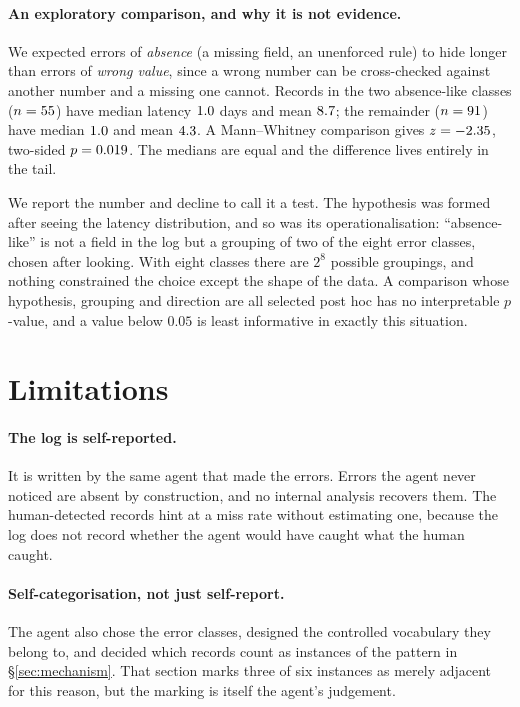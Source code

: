 \documentclass[11pt,a4paper]{article}
\begin{document}
\paragraph{An exploratory comparison, and why it is not evidence.}
We expected errors of \emph{absence} (a missing field, an unenforced rule) to
hide longer than errors of \emph{wrong value}, since a wrong number can be
cross-checked against another number and a missing one cannot. Records in the
two absence-like classes ($n = 55$) have median latency $1.0$ days
and mean $8.7$; the remainder ($n = 91$) have median $1.0$ and
mean $4.3$. A Mann--Whitney comparison gives $z = -2.35$, two-sided
$p = 0.019$. The medians are equal and the difference lives entirely in the
tail.

We report the number and decline to call it a test. The hypothesis was formed
after seeing the latency distribution, and so was its operationalisation:
``absence-like'' is not a field in the log but a grouping of two of the eight
error classes, chosen after looking. With eight classes there are $2^{8}$
possible groupings, and nothing constrained the choice except the shape of the
data. A comparison whose hypothesis, grouping and direction are all selected
post hoc has no interpretable $p$-value, and a value below $0.05$ is least
informative in exactly this situation.

\section{Limitations}\label{sec:limits}

\paragraph{The log is self-reported.} It is written by the same agent that
made the errors. Errors the agent never noticed are absent by construction,
and no internal analysis recovers them. The \ErrHuman{} human-detected records
hint at a miss rate without estimating one, because the log does not record
whether the agent would have caught what the human caught.

\paragraph{Self-categorisation, not just self-report.} The agent also chose
the error classes, designed the controlled vocabulary they belong to, and
decided which records count as instances of the pattern in
\S\ref{sec:mechanism}. That section marks three of six instances as merely
adjacent for this reason, but the marking is itself the agent's judgement.
\end{document}
